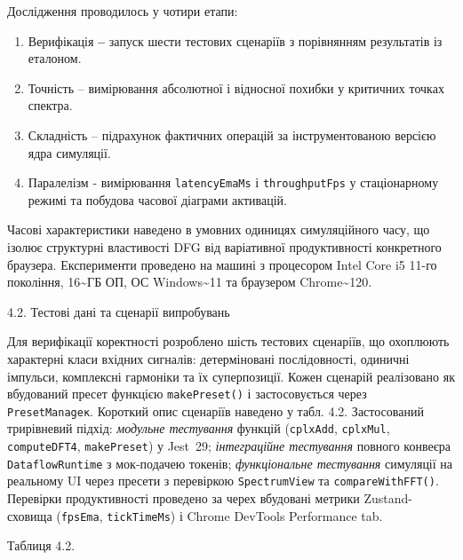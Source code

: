 \documentclass[
]{article}
\begin{document}
Дослідження проводилось у чотири етапи:

\begin{enumerate}
\def\labelenumi{\arabic{enumi}.}
\item
  Верифікація \textbf{--} запуск шести тестових сценаріїв з порівнянням
  результатів із еталоном.
\item
  Точність -- вимірювання абсолютної і відносної похибки у критичних
  точках спектра.
\item
  Складність -- підрахунок фактичних операцій за інструментованою
  версією ядра симуляції.
\item
  Паралелізм - вимірювання \texttt{latencyEmaMs} і
  \texttt{throughputFps} у стаціонарному режимі та побудова часової
  діаграми активацій.
\end{enumerate}

Часові характеристики наведено в умовних одиницях симуляційного часу, що
ізолює структурні властивості DFG від варіативної продуктивності
конкретного браузера. Експерименти проведено на машині з процесором
Intel Core i5 11-го покоління, 16\textasciitilde ГБ ОП, ОС
Windows\textasciitilde11 та браузером Chrome\textasciitilde120.

\protect{}\label{_Toc229681166}{}4.2. Тестові дані та
сценарії випробувань

Для верифікації коректності розроблено шість тестових сценаріїв, що
охоплюють характерні класи вхідних сигналів: детерміновані
послідовності, одиничні імпульси, комплексні гармоніки та їх
суперпозиції. Кожен сценарій реалізовано як вбудований пресет функцією
\texttt{makePreset}\texttt{()} і застосовується через
\texttt{PresetManage}\texttt{к}. Короткий опис сценаріїв наведено у
табл. 4.2. Застосований трирівневий підхід: \emph{модульне тестування}
функцій (\texttt{cplxAdd}, \texttt{cplxMul}, \texttt{computeDFT4},
\texttt{makePreset}) у Jest~29; \emph{інтеграційне тестування} повного
конвеєра \texttt{DataflowRuntime} з мок-подачею токенів;
\emph{функціональне тестування} симуляції на реальному UI через пресети
з перевіркою \texttt{SpectrumView} та
\texttt{compareWithFFT}\texttt{()}. Перевірки продуктивності проведено
за черех вбудовані метрики Zustand-сховища (\texttt{fpsEma},
\texttt{tickTimeMs}) і Chrome DevTools Performance tab.

Таблиця 4.2.
\end{document}
